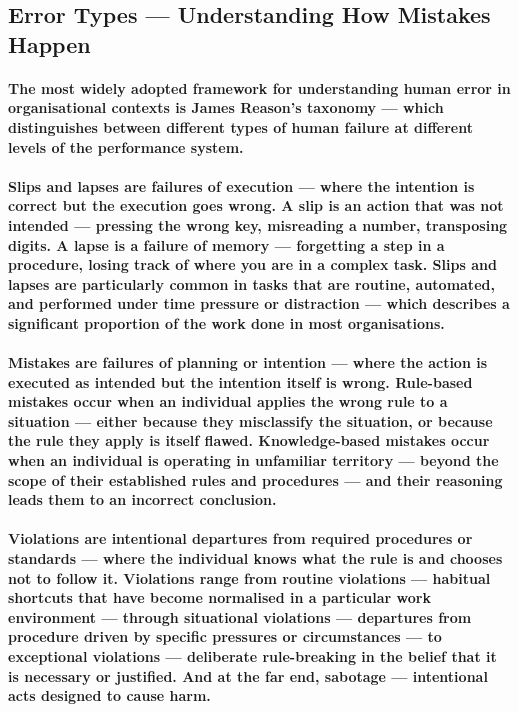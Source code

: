 \subsection{Error Types — Understanding How Mistakes Happen}
\paragraph{The most widely adopted framework for understanding human error in organisational contexts is \textbf{James Reason's taxonomy} — which distinguishes between different types of human failure at different levels of the performance system.}
\paragraph{\textbf{Slips and lapses} are failures of execution — where the intention is correct but the execution goes wrong. A slip is an action that was not intended — pressing the wrong key, misreading a number, transposing digits. A lapse is a failure of memory — forgetting a step in a procedure, losing track of where you are in a complex task. Slips and lapses are particularly common in tasks that are routine, automated, and performed under time pressure or distraction — which describes a significant proportion of the work done in most organisations.}
\paragraph{\textbf{Mistakes} are failures of planning or intention — where the action is executed as intended but the intention itself is wrong. Rule-based mistakes occur when an individual applies the wrong rule to a situation — either because they misclassify the situation, or because the rule they apply is itself flawed. Knowledge-based mistakes occur when an individual is operating in unfamiliar territory — beyond the scope of their established rules and procedures — and their reasoning leads them to an incorrect conclusion.}
\paragraph{\textbf{Violations} are intentional departures from required procedures or standards — where the individual knows what the rule is and chooses not to follow it. Violations range from routine violations — habitual shortcuts that have become normalised in a particular work environment — through situational violations — departures from procedure driven by specific pressures or circumstances — to exceptional violations — deliberate rule-breaking in the belief that it is necessary or justified. And at the far end, sabotage — intentional acts designed to cause harm.}
